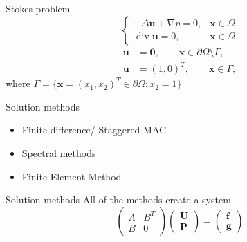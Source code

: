 \documentclass[aspectratio=169]{beamer}
\begin{document}
\begin{frame}{\Large Stokes problem}
  \Large
  \begin{equation*}
    \begin{cases}
      -\Delta \mathbf{u} 
      + \nabla p = 0, & \mathbf{x} \in \Omega \\[5pt]
      \operatorname{div} \mathbf{u} = 0, & \mathbf{x} \in \Omega
    \end{cases}
  \end{equation*}
  \begin{align*}
    \mathbf{u} &= \mathbf{0}, \qquad\mathbf{x} \in \partial\Omega \setminus \varGamma, \\[5pt]
    \mathbf{u} &= (1,0)^T, \qquad \mathbf{x} \in \varGamma,
  \end{align*}
  \centering
  where $\varGamma = \{\mathbf{x} = (x_1, x_2)^T \in \partial \Omega: x_2 = 1\}$
\end{frame}

\begin{frame}{\Large Solution methods}
  \Large
  \begin{itemize}
    \item Finite difference/ Staggered MAC
    \item Spectral methods
    \item Finite Element Method
  \end{itemize}
\end{frame}

\begin{frame}{\Large Solution methods}
  \Large
  All of the methods create a system
  \begin{equation*}
  \begin{pmatrix}
    A & B^{T} \\
    B & 0
  \end{pmatrix}
  \begin{pmatrix}
    \mathbf{U} \\
    \mathbf{P}
  \end{pmatrix}
  =
  \begin{pmatrix}
    \mathbf{f} \\
    \mathbf{g}
  \end{pmatrix}
  \end{equation*}
\end{frame}
\end{document}
